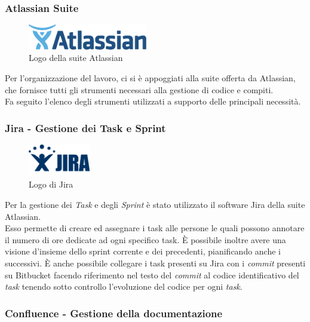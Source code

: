 \subsubsection{Atlassian Suite}
\begin{figure}[H]
\begin{center}
\includegraphics[height=1.1cm]{Pics/atlassian_logo.png}
\caption{Logo della suite Atlassian}
\end{center}
\end{figure}
Per l'organizzazione del lavoro, ci si è appoggiati alla suite offerta da Atlassian, che fornisce tutti gli strumenti necessari alla gestione di codice e compiti. \\
Fa seguito l'elenco degli strumenti utilizzati a supporto delle principali necessità.

\subsubsection{Jira - Gestione dei Task e Sprint }
\begin{figure}[H]
\begin{center}
\includegraphics[height=1.4cm]{Pics/jira_logo.png}
\caption{Logo di Jira}
\end{center}
\end{figure}

Per la gestione dei \textit{Task} e degli \textit{Sprint} è stato utilizzato il software Jira della suite Atlassian.\\
Esso permette di creare ed assegnare i task alle persone le quali possono annotare il numero di ore dedicate ad ogni specifico task. È possibile inoltre avere una visione d'insieme dello sprint corrente e dei precedenti, pianificando anche i successivi.
È anche possibile collegare i task presenti su Jira con i \textit{commit} presenti su Bitbucket facendo riferimento nel testo del \textit{commit} al codice identificativo del \textit{task} tenendo sotto controllo l'evoluzione del codice per ogni \textit{task}.


\subsubsection{Confluence - Gestione  della documentazione}


